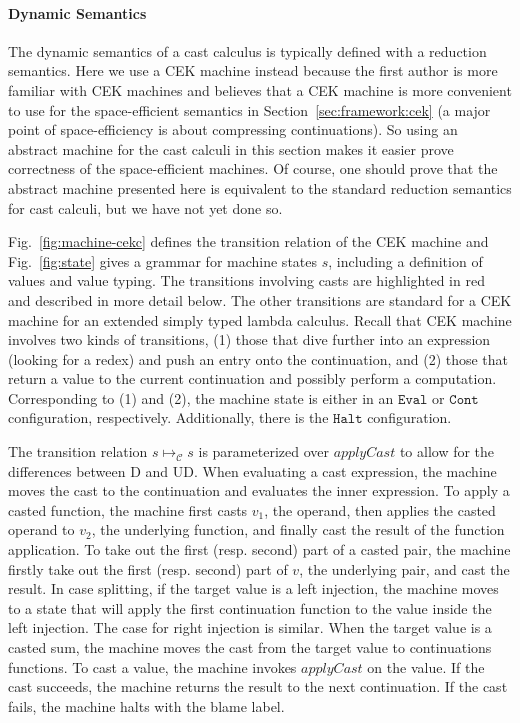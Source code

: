 \documentclass[acmsmall,review,anonymous]{acmart}\settopmatter{printfolios=true,printccs=false,printacmref=false}
\newcommand{\judgeCreduce}[2]{#1 \longmapsto_{\mathcal{C}} #2}
\begin{document}
\paragraph{Dynamic Semantics}

The dynamic semantics of a cast calculus is typically defined with a
reduction semantics. Here we use a CEK machine
\citep{felleisen1986control} instead because the first author is more
familiar with CEK machines and believes that a CEK machine is more
convenient to use for the space-efficient semantics in
Section~\ref{sec:framework:cek} (a major point of space-efficiency is about 
compressing continuations). So using an abstract machine for the cast calculi in
this section makes it easier prove correctness of the space-efficient
machines. Of course, one should prove that the abstract machine
presented here is equivalent to the standard reduction semantics for
cast calculi, but we have not yet done so.

Fig.~\ref{fig:machine-cekc} defines the transition relation of the CEK
machine and Fig.~\ref{fig:state} gives a grammar for machine states
$s$, including a definition of values and value typing. The
transitions involving casts are highlighted in red and described in
more detail below. The other transitions are standard for a CEK
machine for an extended simply typed lambda calculus.
%
Recall that CEK machine involves two kinds of transitions, (1) those
that dive further into an expression (looking for a redex) and push an
entry onto the continuation, and (2) those that return a value to the
current continuation and possibly perform a computation.
Corresponding to (1) and (2), the machine state is either in an
$\mathtt{Eval}$ or $\mathtt{Cont}$ configuration, respectively.
Additionally, there is the $\mathtt{Halt}$ configuration.

The transition relation $\judgeCreduce{s}{s}$ is parameterized over
$applyCast$ to allow for the differences between D and UD.
%
When evaluating a cast expression, the machine moves the cast to the
continuation and evaluates the inner expression.
To apply a casted function, the machine first casts $ v_1 $, the
operand, then applies the casted operand to $ v_2 $, the underlying
function, and finally cast the result of the function application.
%
To take out the first (resp. second) part of a casted pair, the
machine firstly take out the first (resp. second) part of $ v $, the
underlying pair, and cast the result.
%
In case splitting, if the target value is a left injection, the
machine moves to a state that will apply the first continuation
function to the value inside the left injection. The case for right
injection is similar.
%
When the target value is a casted sum, the machine moves the cast from
the target value to continuations functions.
%
To cast a value, the machine invokes $applyCast$ on the value.  If the
cast succeeds, the machine returns the result to the next
continuation.  If the cast fails, the machine halts with the blame
label.
%
\end{document}
